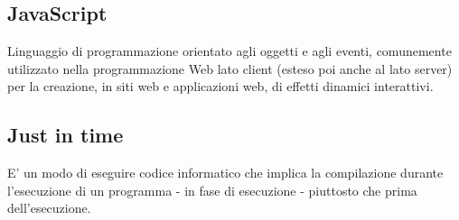 \documentclass[../glossario.tex]{subfiles}
\begin{document}
\subsection*{JavaScript}
Linguaggio di programmazione orientato agli oggetti e agli eventi, comunemente utilizzato nella programmazione Web lato client (esteso poi anche al lato server) per la creazione, in siti web e applicazioni web, di effetti dinamici interattivi.

\subsection*{Just in time}
E' un modo di eseguire codice informatico che implica la compilazione durante l'esecuzione di un programma - in fase di esecuzione - piuttosto che prima dell'esecuzione. 
    
\end{document}
